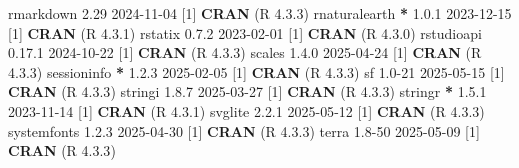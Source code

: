 \documentclass[
]{article}
\newenvironment{Shaded}{\begin{snugshade}}{\end{snugshade}}
\newcommand{\DecValTok}[1]{\textcolor[rgb]{0.00,0.00,0.81}{#1}}
\newcommand{\FloatTok}[1]{\textcolor[rgb]{0.00,0.00,0.81}{#1}}
\newcommand{\FunctionTok}[1]{\textcolor[rgb]{0.13,0.29,0.53}{\textbf{#1}}}
\newcommand{\NormalTok}[1]{#1}
\newcommand{\SpecialCharTok}[1]{\textcolor[rgb]{0.81,0.36,0.00}{\textbf{#1}}}
\begin{document}
\begin{Shaded}
\begin{Highlighting}[]
\NormalTok{ rmarkdown       }\FloatTok{2.29}    \DecValTok{2024{-}11{-}04}\NormalTok{ [}\DecValTok{1}\NormalTok{] }\FunctionTok{CRAN}\NormalTok{ (R }\DecValTok{4}\NormalTok{.}\FloatTok{3.3}\NormalTok{)}
\NormalTok{ rnaturalearth }\SpecialCharTok{*} \DecValTok{1}\NormalTok{.}\FloatTok{0.1}   \DecValTok{2023{-}12{-}15}\NormalTok{ [}\DecValTok{1}\NormalTok{] }\FunctionTok{CRAN}\NormalTok{ (R }\DecValTok{4}\NormalTok{.}\FloatTok{3.1}\NormalTok{)}
\NormalTok{ rstatix         }\DecValTok{0}\NormalTok{.}\FloatTok{7.2}   \DecValTok{2023{-}02{-}01}\NormalTok{ [}\DecValTok{1}\NormalTok{] }\FunctionTok{CRAN}\NormalTok{ (R }\DecValTok{4}\NormalTok{.}\FloatTok{3.0}\NormalTok{)}
\NormalTok{ rstudioapi      }\DecValTok{0}\NormalTok{.}\FloatTok{17.1}  \DecValTok{2024{-}10{-}22}\NormalTok{ [}\DecValTok{1}\NormalTok{] }\FunctionTok{CRAN}\NormalTok{ (R }\DecValTok{4}\NormalTok{.}\FloatTok{3.3}\NormalTok{)}
\NormalTok{ scales          }\DecValTok{1}\NormalTok{.}\FloatTok{4.0}   \DecValTok{2025{-}04{-}24}\NormalTok{ [}\DecValTok{1}\NormalTok{] }\FunctionTok{CRAN}\NormalTok{ (R }\DecValTok{4}\NormalTok{.}\FloatTok{3.3}\NormalTok{)}
\NormalTok{ sessioninfo   }\SpecialCharTok{*} \DecValTok{1}\NormalTok{.}\FloatTok{2.3}   \DecValTok{2025{-}02{-}05}\NormalTok{ [}\DecValTok{1}\NormalTok{] }\FunctionTok{CRAN}\NormalTok{ (R }\DecValTok{4}\NormalTok{.}\FloatTok{3.3}\NormalTok{)}
\NormalTok{ sf              }\FloatTok{1.0}\DecValTok{{-}21}  \DecValTok{2025{-}05{-}15}\NormalTok{ [}\DecValTok{1}\NormalTok{] }\FunctionTok{CRAN}\NormalTok{ (R }\DecValTok{4}\NormalTok{.}\FloatTok{3.3}\NormalTok{)}
\NormalTok{ stringi         }\DecValTok{1}\NormalTok{.}\FloatTok{8.7}   \DecValTok{2025{-}03{-}27}\NormalTok{ [}\DecValTok{1}\NormalTok{] }\FunctionTok{CRAN}\NormalTok{ (R }\DecValTok{4}\NormalTok{.}\FloatTok{3.3}\NormalTok{)}
\NormalTok{ stringr       }\SpecialCharTok{*} \DecValTok{1}\NormalTok{.}\FloatTok{5.1}   \DecValTok{2023{-}11{-}14}\NormalTok{ [}\DecValTok{1}\NormalTok{] }\FunctionTok{CRAN}\NormalTok{ (R }\DecValTok{4}\NormalTok{.}\FloatTok{3.1}\NormalTok{)}
\NormalTok{ svglite         }\DecValTok{2}\NormalTok{.}\FloatTok{2.1}   \DecValTok{2025{-}05{-}12}\NormalTok{ [}\DecValTok{1}\NormalTok{] }\FunctionTok{CRAN}\NormalTok{ (R }\DecValTok{4}\NormalTok{.}\FloatTok{3.3}\NormalTok{)}
\NormalTok{ systemfonts     }\DecValTok{1}\NormalTok{.}\FloatTok{2.3}   \DecValTok{2025{-}04{-}30}\NormalTok{ [}\DecValTok{1}\NormalTok{] }\FunctionTok{CRAN}\NormalTok{ (R }\DecValTok{4}\NormalTok{.}\FloatTok{3.3}\NormalTok{)}
\NormalTok{ terra           }\FloatTok{1.8}\DecValTok{{-}50}  \DecValTok{2025{-}05{-}09}\NormalTok{ [}\DecValTok{1}\NormalTok{] }\FunctionTok{CRAN}\NormalTok{ (R }\DecValTok{4}\NormalTok{.}\FloatTok{3.3}\NormalTok{)}

\end{Highlighting}
\end{Shaded}
\end{document}

